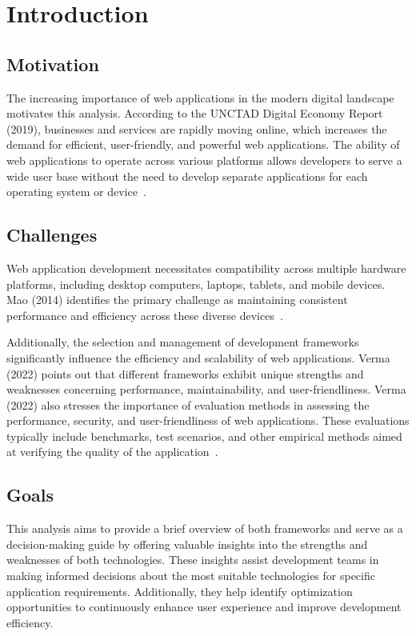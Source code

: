\chapter{Introduction}
\label{cha:Introduction}


\section{Motivation}
The increasing importance of web applications in the modern digital landscape motivates this analysis. According to the UNCTAD Digital Economy Report (2019), businesses and services are rapidly moving online, which increases the demand for efficient, user-friendly, and powerful web applications. The ability of web applications to operate across various platforms allows developers to serve a wide user base without the need to develop separate applications for each operating system or device~\cite{unctad}.

\section{Challenges}

Web application development necessitates compatibility across multiple hardware platforms, including desktop computers, laptops, tablets, and mobile devices. Mao (2014) identifies the primary challenge as maintaining consistent performance and efficiency across these diverse devices~\cite{mao2014developing}.

Additionally, the selection and management of development frameworks significantly influence the efficiency and scalability of web applications. Verma (2022) points out that different frameworks exhibit unique strengths and weaknesses concerning performance, maintainability, and user-friendliness. Verma (2022) also stresses the importance of evaluation methods in assessing the performance, security, and user-friendliness of web applications. These evaluations typically include benchmarks, test scenarios, and other empirical methods aimed at verifying the quality of the application~\cite{verma2022comparison}.

\section{Goals}
This analysis aims to provide a brief overview of both frameworks and serve as a decision-making guide by offering valuable insights into the strengths and weaknesses of both technologies. 
These insights assist development teams in making informed decisions about the most suitable technologies for specific application requirements. Additionally, they help identify optimization opportunities to continuously enhance user experience and improve development efficiency.

